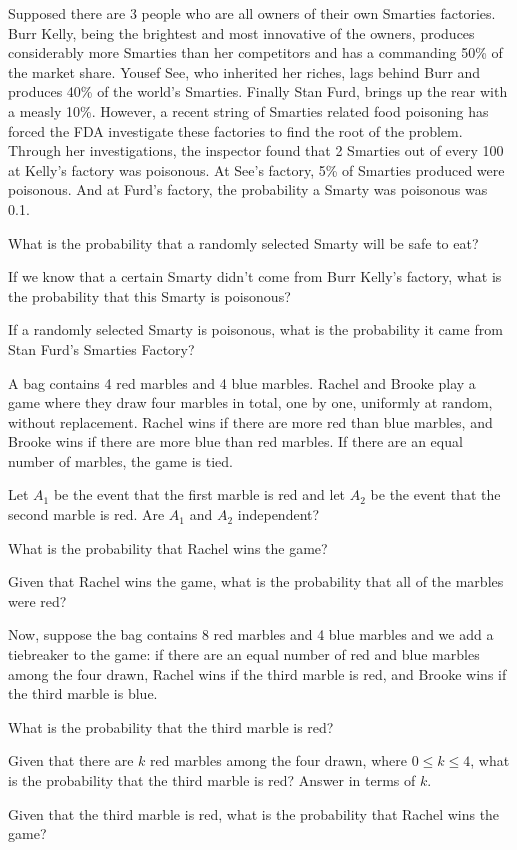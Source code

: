 \documentclass[11pt]{article}
\begin{document}
Supposed there are 3 people who are all owners of their own Smarties factories. Burr Kelly, being the brightest and most innovative of the owners, produces considerably more Smarties than her competitors and has a commanding 50\% of the market share. Yousef See, who inherited her riches, lags behind Burr and produces 40\% of the world's Smarties. Finally Stan Furd, brings up the rear with a measly 10\%. However, a recent string of Smarties related food poisoning has forced the FDA investigate these factories to find the root of the problem. Through her investigations, the inspector found that 2 Smarties out of every 100 at Kelly's factory was poisonous. At See's factory, 5\% of Smarties produced were poisonous. And at Furd's factory, the probability a Smarty was poisonous was 0.1. 

\begin{Parts}
\Part
What is the probability that a randomly selected Smarty will be safe to eat?

\Part
If we know that a certain Smarty didn't come from Burr Kelly's factory, what is the probability that this Smarty is poisonous?

\Part
If a randomly selected Smarty is poisonous, what is the probability it came from Stan Furd's Smarties Factory?

\end{Parts}


A bag contains 4 red marbles and 4 blue marbles. Rachel and Brooke play a game where they draw four marbles in total, one by one, uniformly at random, without replacement. Rachel wins if there are more red than blue marbles, and Brooke wins if there are more blue than red marbles. If there are an equal number of marbles, the game is tied.
\begin{Parts}
    \Part Let $A_1$ be the event that the first marble is red and let $A_2$ be the event that the second marble is red. Are $A_1$ and $A_2$ independent?
    
    \Part What is the probability that Rachel wins the game?
    
    \Part Given that Rachel wins the game, what is the probability that all of the marbles were red?
\end{Parts}
Now, suppose the bag contains 8 red marbles and 4 blue marbles and we add a tiebreaker to the game: if there are an equal number of red and blue marbles among the four drawn, Rachel wins if the third marble is red, and Brooke wins if the third marble is blue. 
\begin{Parts}[resume]
    \Part What is the probability that the third marble is red?
    
    \Part Given that there are $k$ red marbles among the four drawn, where $0 \leq k \leq 4$, what is the probability that the third marble is red? Answer in terms of $k$.
    
    \Part Given that the third marble is red, what is the probability that Rachel wins the game?
    
\end{Parts}
\end{document}
